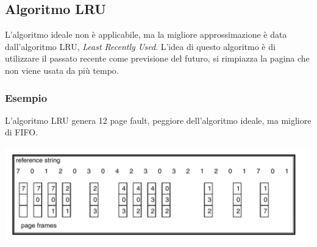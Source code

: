 \documentclass[a4paper,12pt, twoside]{report}
\begin{document}
\subsection{Algoritmo LRU}

L'algoritmo ideale non \`e applicabile, ma la migliore approssimazione \`e data dall'algoritmo LRU, \emph{Least Recently
Used}. L'idea di questo algoritmo \`e di utilizzare il passato recente come previsione del futuro, si rimpiazza la pagina 
che non viene usata da pi\`u tempo. 

\subsubsection{Esempio}
L'algoritmo LRU genera 12 page fault, peggiore dell'algoritmo ideale, ma migliore di FIFO.  
\begin{center}
    \includegraphics[scale=0.15]{lru_alg}
\end{center}
\end{document}
